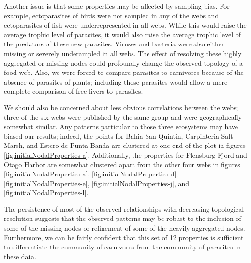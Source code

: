 \documentclass[../dissertation.tex]{subfiles}
\begin{document}
Another issue is that some properties may be affected by sampling bias. For
example, ectoparasites of birds were not sampled in any of the webs and 
ectoparasites of fish were underrepresented in all webs.
While this would raise the average trophic level of parasites, it would also
raise the average trophic level of the predators of these new parasites.
Viruses and bacteria were also either missing or severely underampled in all
webs. The effect of resolving these highly aggregated or missing nodes could
profoundly change the observed topology of a food web. Also, we were forced
to compare parasites to carnivores because of the absence of parasites of
plants; including those parasites would allow a more complete comparison of
free-livers to parasites.

We should also be concerned about less obvious correlations between the webs;
three of the six webs were published by the same group and were geographically
somewhat similar. Any patterns particular to those three ecosystems may have
biased our results; indeed, the points for Bahia San Quintin, Carpinteria Salt
Marsh, and Estero de Punta Banda are clustered at one end of the plot in
figures \ref{fig:initialNodalProperties-a}. Additionally, the properties for
Flensburg Fjord and Otago Harbor are somewhat clustered apart from the other
four webs in figures \ref{fig:initialNodalProperties-a},
\ref{fig:initialNodalProperties-d}, \ref{fig:initialNodalProperties-e},
\ref{fig:initialNodalProperties-j}, and \ref{fig:initialNodalProperties-l}.


The persistence of most of the observed relationships with decreasing
topological resolution suggests that the observed patterns may be robust to the
inclusion of some of the missing nodes or refinement of some of the heavily
aggregated nodes.  Furthermore, we can be fairly
confident that this set of 12 properties is sufficient to differentiate the
community of carnivores from the community of parasites in these data.
\end{document}
